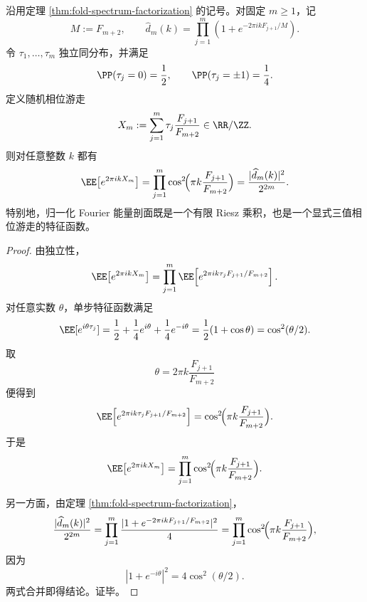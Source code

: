 \begin{theorem}\label{thm:xi-time-part65g-fold-energy-threevalued-phase-walk}
沿用定理 \ref{thm:fold-spectrum-factorization} 的记号。对固定 \(m\ge 1\)，记
\[
M:=F_{m+2},
\qquad
\widehat d_m(k)=\prod_{j=1}^{m}\left(1+e^{-2\pi i kF_{j+1}/M}\right).
\]
令 \(\tau_1,\dots,\tau_m\) 独立同分布，并满足
\[
\PP(\tau_j=0)=\frac12,
\qquad
\PP(\tau_j=\pm 1)=\frac14.
\]
定义随机相位游走
\[
X_m:=
\sum_{j=1}^{m}\tau_j\frac{F_{j+1}}{F_{m+2}}
\in
\RR/\ZZ.
\]
则对任意整数 \(k\) 都有
\[
\EE\bigl[e^{2\pi i kX_m}\bigr]
=
\prod_{j=1}^{m}
\cos^2\!\Bigl(\pi k\frac{F_{j+1}}{F_{m+2}}\Bigr)
=
\frac{|\widehat d_m(k)|^2}{2^{2m}}.
\]
特别地，归一化 Fourier 能量剖面既是一个有限 Riesz 乘积，也是一个显式三值相位游走的特征函数。
\end{theorem}
\begin{proof}
由独立性，
\[
\EE\bigl[e^{2\pi i kX_m}\bigr]
=
\prod_{j=1}^{m}
\EE\!\left[
e^{2\pi i k\tau_jF_{j+1}/F_{m+2}}
\right].
\]
对任意实数 \(\theta\)，单步特征函数满足
\[
\EE[e^{i\theta\tau_j}]
=
\frac12+\frac14e^{i\theta}+\frac14e^{-i\theta}
=
\frac12(1+\cos\theta)
=
\cos^2(\theta/2).
\]
取
\[
\theta=2\pi k\frac{F_{j+1}}{F_{m+2}}
\]
便得到
\[
\EE\!\left[
e^{2\pi i k\tau_jF_{j+1}/F_{m+2}}
\right]
=
\cos^2\!\Bigl(\pi k\frac{F_{j+1}}{F_{m+2}}\Bigr).
\]
于是
\[
\EE\bigl[e^{2\pi i kX_m}\bigr]
=
\prod_{j=1}^{m}
\cos^2\!\Bigl(\pi k\frac{F_{j+1}}{F_{m+2}}\Bigr).
\]

另一方面，由定理 \ref{thm:fold-spectrum-factorization}，
\[
\frac{|\widehat d_m(k)|^2}{2^{2m}}
=
\prod_{j=1}^{m}
\frac{|1+e^{-2\pi i kF_{j+1}/F_{m+2}}|^2}{4}
=
\prod_{j=1}^{m}
\cos^2\!\Bigl(\pi k\frac{F_{j+1}}{F_{m+2}}\Bigr),
\]
因为
\[
|1+e^{-i\theta}|^2=4\cos^2(\theta/2).
\]
两式合并即得结论。证毕。
\end{proof}

